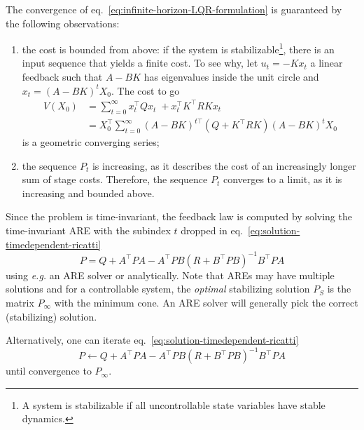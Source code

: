 The convergence of eq.~\eqref{eq:infinite-horizon-LQR-formulation} is guaranteed by the following observations:
\begin{enumerate}
\item the cost is bounded from above: if the system is stabilizable\footnote{A system is stabilizable if all uncontrollable state variables have stable dynamics.}, there is an input sequence that yields a finite cost. To see why, let $u_t = -Kx_t$ a linear feedback such that $A-BK$ has eigenvalues inside the unit circle and $x_t=(A-BK)^tX_0$. The cost to go
\begin{align*}
  V(X_0) &= \sum_{t=0}^\infty x_t^\top Qx_t^{\phantom{\top}} + x_t^\top K^\top RKx_t \\
         &= X_0^\top \sum_{t=0}^\infty (A-BK)^{t\top}\left(Q+K^\top RK\right)(A-BK)^tX_0
\end{align*}
is a geometric converging series;
\item the sequence $P_{t}$ is increasing, as it describes the cost of an increasingly longer sum of stage costs.
Therefore, the sequence $P_t$ converges to a limit, as it is increasing and bounded above.
\end{enumerate}

Since the problem is time-invariant, the feedback law is computed by solving the time-invariant ARE with the subindex $t$ dropped in eq.~\eqref{eq:solution-timedependent-ricatti}
\begin{equation*}
  P = Q + A^\top P A - A^\top P B\left(R + B^\top PB\right)^{-1}B^\top P A
\end{equation*}
using \textit{e.g.} an ARE solver or analytically. Note that AREs may have multiple solutions and for a controllable system, the \emph{optimal} stabilizing solution $P_S$ is the matrix $P_\infty$ with the minimum cone. An ARE solver will generally pick the correct (stabilizing) solution.

Alternatively, one can iterate eq.~\eqref{eq:solution-timedependent-ricatti}
\begin{equation}
  \label{eq:solution-timeindependent-ricatti-iterate}
  P \leftarrow Q + A^\top PA - A^\top PB\left(R+B^\top PB\right)^{-1}B^\top PA
\end{equation}
until convergence to $P_\infty$.


